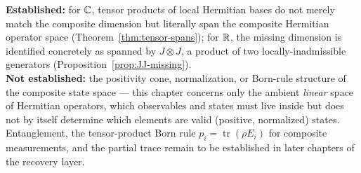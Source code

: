 \begin{ledgerentry}
\textbf{Established:} for $\mathbb{C}$, tensor products of local Hermitian bases do
not merely match the composite dimension but literally span the composite
Hermitian operator space (Theorem~\ref{thm:tensor-spans}); for $\mathbb{R}$, the
missing dimension is identified concretely as spanned by $J\otimes J$, a
product of two locally-inadmissible generators
(Proposition~\ref{prop:JJ-missing}).\\
\textbf{Not established:} the positivity cone, normalization, or Born-rule
structure of the composite state space — this chapter concerns only the
ambient \emph{linear} space of Hermitian operators, which observables and
states must live inside but does not by itself determine which elements are
valid (positive, normalized) states. Entanglement, the tensor-product Born
rule $p_i = \operatorname{tr}(\rho E_i)$ for composite measurements, and the
partial trace remain to be established in later chapters of the recovery
layer.
\end{ledgerentry}
